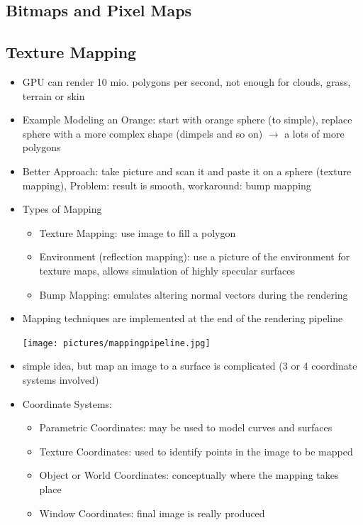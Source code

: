 \documentclass[11pt,a4paper]{article}
\begin{document}
	\subsection{Bitmaps and Pixel Maps}
	\subsection{Texture Mapping}
	\begin{itemize}
		\item GPU can render 10 mio. polygons per second, not enough for clouds, grass, terrain or skin
		\item Example Modeling an Orange: start with orange sphere (to simple), replace sphere with a more complex shape (dimpels and so on) $\rightarrow$ a lots of more polygons
		\item Better Approach: take picture and scan it and paste it on a sphere (texture mapping), Problem: result is smooth, workaround: bump mapping
		\item Types of Mapping
			\begin{itemize}
				\item Texture Mapping: use image to fill a polygon
				\item Environment (reflection mapping): use a picture of the environment for texture maps, allows simulation of highly specular surfaces
				\item Bump Mapping: emulates altering normal vectors during the rendering
			\end{itemize}
		\item Mapping techniques are implemented at the end of the rendering pipeline
		\begin{center}
			\texttt{[image: pictures/mappingpipeline.jpg]}
		\end{center}
		\item simple idea, but map an image to a surface is complicated (3 or 4 coordinate systems involved)
		\item Coordinate Systems:
			\begin{itemize}
				\item Parametric Coordinates: may be used to model curves and surfaces
				\item Texture Coordinates: used to identify points in the image to be mapped
				\item Object or World Coordinates: conceptually where the mapping takes place
				\item Window Coordinates: final image is really produced
			\end{itemize}

\end{itemize}
\end{document}
